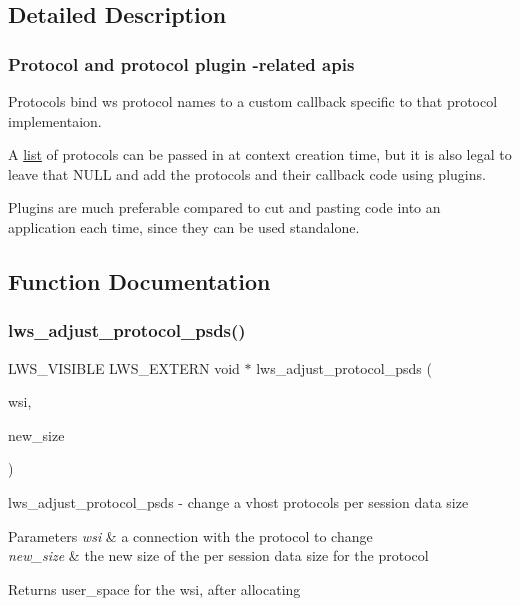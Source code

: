 \subsection{Detailed Description}
\subsubsection*{Protocol and protocol plugin -\/related apis}

Protocols bind ws protocol names to a custom callback specific to that protocol implementaion.

A \hyperlink{protocollist-p}{list} of protocols can be passed in at context creation time, but it is also legal to leave that N\+U\+LL and add the protocols and their callback code using plugins.

Plugins are much preferable compared to cut and pasting code into an application each time, since they can be used standalone. 

\subsection{Function Documentation}
\mbox{\label{group__Protocols-and-Plugins_ga40c0a7194f2ac0c2813ad7e374f0d852}} 
\subsubsection{\texorpdfstring{lws\+\_\+adjust\+\_\+protocol\+\_\+psds()}{lws\_adjust\_protocol\_psds()}}
{\footnotesize\ttfamily L\+W\+S\+\_\+\+V\+I\+S\+I\+B\+LE L\+W\+S\+\_\+\+E\+X\+T\+E\+RN void $\ast$ lws\+\_\+adjust\+\_\+protocol\+\_\+psds (\begin{DoxyParamCaption}\item[{struct \hyperlink{structlws}{lws} $\ast$}]{wsi,  }\item[{size\+\_\+t}]{new\+\_\+size }\end{DoxyParamCaption})}

lws\+\_\+adjust\+\_\+protocol\+\_\+psds -\/ change a vhost protocol\textquotesingle{}s per session data size


\begin{DoxyParams}{Parameters}
{\em wsi} & a connection with the protocol to change \\
\hline
{\em new\+\_\+size} & the new size of the per session data size for the protocol\\
\hline
\end{DoxyParams}
Returns user\+\_\+space for the wsi, after allocating

